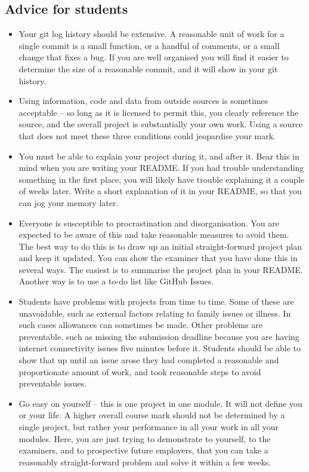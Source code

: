 \documentclass[12pt, a4paper]{article}
\begin{document}
\subsection*{Advice for students}
\begin{itemize}
    \item
    Your git log history should be extensive.
    A reasonable unit of work for a single commit is a small function, or a handful of comments, or a small change that fixes a bug.
    If you are well organised you will find it easier to determine the size of a reasonable commit, and it will show in your git history.
    \item
    Using information, code and data from outside sources is sometimes acceptable -- so long as it is licensed to permit this, you clearly reference the source, and the overall project is substantially your own work.
    Using a source that does not meet these three conditions could jeopardise your mark.
    \item
    You must be able to explain your project during it, and after it.
    Bear this in mind when you are writing your README.
    If you had trouble understanding something in the first place, you will likely have trouble explaining it a couple of weeks later.
    Write a short explanation of it in your README, so that you can jog your memory later.
    \item
    Everyone is susceptible to procrastination and disorganisation.
    You are expected to be aware of this and take reasonable measures to avoid them.
    The best way to do this is to draw up an initial straight-forward project plan and keep it updated.
    You can show the examiner that you have done this in several ways.
    The easiest is to summarise the project plan in your README.
    Another way is to use a to-do list like GitHub Issues.
    \item
    Students have problems with projects from time to time.
    Some of these are unavoidable, such as external factors relating to family issues or illness.
    In such cases allowances can sometimes be made.
    Other problems are preventable, such as missing the submission deadline because you are having internet connectivity issues five minutes before it.
    Students should be able to show that up until an issue arose they had completed a reasonable and proportionate amount of work, and took reasonable steps to avoid preventable issues.
    \item
    Go easy on yourself -- this is one project in one module.
    It will not define you or your life.
    A higher overall course mark should not be determined by a single project, but rather your performance in all your work in all your modules.
    Here, you are just trying to demonstrate to yourself, to the examiners, and to prospective future employers, that you can take a reasonably straight-forward problem and solve it within a few weeks.
\end{itemize}
 



\end{document}
